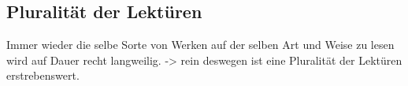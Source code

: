 \begin{comment}
    [Kolodny]
"what we are taught to read well and with pleasure,
when we are young, predisposes us to certain specific kinds of
adult reading tastes."
"The delight we learn to take in the mastery
of these interpretive strategies is then often mistakenly construed
as our delight in reading specific texts, especially in the case of
works that would otherwise be unavailable or even offensive to
us."
-> delight from successfully applying established paradigms
(vgl me and poetry)

", I have been
able to enter that text through interpretive strategies which allow
me to displace less comfortable observations with others to which
I have been taught pleasurably to attend"

"For, simply
put, we read well, and with pleasure, what we already know how
to read; and what we know how to read is to a large extent depend-
ent upon what we have already read (works from which we've
developed our expectations and learned our interpretive strategies).
What we then choose to read-and, by extension, teach and there-
by "canonize"-usually follows upon our previous reading. Radical
breaks are tiring, demanding, uncomfortable, and sometimes wholly
beyond our comprehension."

"we must re-
examine not only our aesthetics but, as well, the inherent biases
and assumptions informing the critical methods which (in part)
shape our aesthetic responses."

\end{comment}


\subsection{Pluralität der Lektüren}

Immer wieder die selbe Sorte von Werken auf der selben Art und Weise zu lesen wird auf Dauer recht langweilig. -> rein deswegen ist eine Pluralität der Lektüren erstrebenswert.

